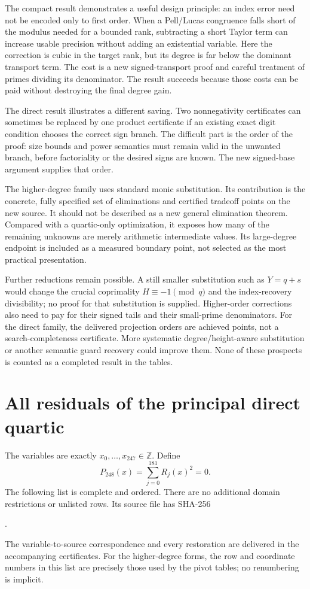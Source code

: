 \documentclass[11pt,letterpaper]{article}
\newcommand{\Z}{\mathbb Z}
\theoremstyle{definition}
\theoremstyle{remark}
\begin{document}
The compact result demonstrates a useful design principle: an index error
need not be encoded only to first order.  When a Pell/Lucas congruence falls
short of the modulus needed for a bounded rank, subtracting a short Taylor
term can increase usable precision without adding an existential variable.
Here the correction is cubic in the target rank, but its degree is far below
the dominant transport term.  The cost is a new signed-transport proof and
careful treatment of primes dividing its denominator.  The result succeeds
because those costs can be paid without destroying the final degree gain.

The direct result illustrates a different saving.  Two nonnegativity certificates
can sometimes be replaced by one product certificate if an existing exact
digit condition chooses the correct sign branch.  The difficult part is
the order of the proof: size bounds and power semantics must remain valid
in the unwanted branch, before factoriality or the desired signs are known.
The new signed-base argument supplies that order.

The higher-degree family uses standard monic substitution.  Its contribution
is the concrete, fully specified set of eliminations and certified tradeoff
points on the new source.  It should not be described as a new general
elimination theorem.  Compared with a quartic-only optimization, it exposes
how many of the remaining unknowns are merely arithmetic intermediate
values.  Its large-degree endpoint is included as a measured boundary point,
not selected as the most practical presentation.

Further reductions remain possible.  A still smaller substitution such as
$Y=q+s$ would change the crucial coprimality $H\equiv-1\pmod q$ and the
index-recovery divisibility; no proof for that substitution is supplied.
Higher-order corrections also need to pay for their signed tails and their
small-prime denominators.  For the direct family, the delivered projection
orders are achieved points, not a search-completeness certificate.  More
systematic degree/height-aware substitution or another semantic guard
recovery could improve them.  None of these prospects is counted as a
completed result in the tables.

\appendix
\clearpage


\clearpage
\section{All residuals of the principal direct quartic}
\label{app:residuals}
The variables are exactly $x_0,\ldots,x_{247}\in\Z$.  Define
\[
 \boxed{\quad P_{248}(x)=\sum_{j=0}^{181}R_j(x)^2=0.\quad}
\]
The following list is complete and ordered.  There are no additional domain
restrictions or unlisted rows.  Its source file has SHA-256
\begin{center}\small
{}.
\end{center}
The variable-to-source correspondence and every restoration are delivered
in the accompanying certificates.  For the higher-degree forms, the row
and coordinate numbers in this list are precisely those used by the pivot
tables; no renumbering is implicit.
\end{document}
